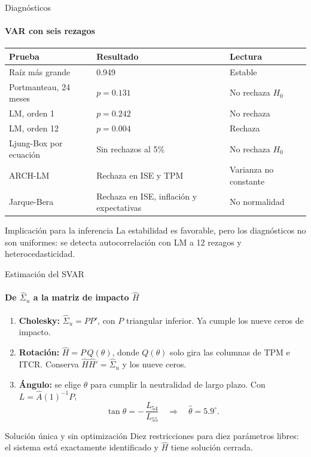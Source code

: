 \documentclass{beamer}
\begin{document}
\begin{frame}{Diagnósticos}
  \framesubtitle{VAR con seis rezagos}
  \begin{center}
  \scriptsize
  \renewcommand{\arraystretch}{1.3}
  \begin{tabular}{@{}p{}p{}p{}@{}}
    \toprule
    \textbf{Prueba} & \textbf{Resultado} & \textbf{Lectura} \\
    \midrule
    Raíz más grande & 0.949 & Estable \\
    Portmanteau, 24 meses & $p=0.131$ & No rechaza $H_0$ \\
    LM, orden 1 & $p=0.242$ & No rechaza \\
    LM, orden 12 & $p=0.004$ & \alert{Rechaza} \\
    Ljung-Box por ecuación & Sin rechazos al 5\% & No rechaza $H_0$ \\
    ARCH-LM & Rechaza en ISE y TPM & Varianza no constante \\
    Jarque-Bera & Rechaza en ISE, inflación y expectativas & No normalidad \\
    \bottomrule
  \end{tabular}
  \end{center}
  \vfill
  \begin{alertblock}{Implicación para la inferencia}
    La estabilidad es favorable, pero los diagnósticos no son uniformes:
    se detecta autocorrelación con LM a 12 rezagos y heterocedasticidad.
  \end{alertblock}
\end{frame}

\begin{frame}{Estimación del SVAR}
  \framesubtitle{De $\hat\Sigma_u$ a la matriz de impacto $\hat H$}
  \small
  \begin{enumerate}[label=\arabic*.]
    \item \textbf{Cholesky:} $\hat\Sigma_u = PP'$, con $P$ triangular inferior.
    Ya cumple los \alert{nueve ceros} de impacto.
    \item \textbf{Rotación:} $\hat H = P\,Q(\theta)$, donde $Q(\theta)$ solo gira las columnas
    de TPM e ITCR. Conserva $\hat H\hat H'=\hat\Sigma_u$ y los nueve ceros.
    \item \textbf{Ángulo:} se elige $\theta$ para cumplir la neutralidad de largo plazo.
    Con $L=\hat A(1)^{-1}P$,
    \[
      \tan\theta = -\,\frac{L_{54}}{L_{55}}
      \quad\Longrightarrow\quad \hat\theta = 5.9^\circ .
    \]
  \end{enumerate}
  \vfill
  \begin{block}{Solución única y sin optimización}
    Diez restricciones para diez parámetros libres: el sistema está exactamente
    identificado y $\hat H$ tiene solución cerrada.
  \end{block}
\end{frame}
\end{document}
